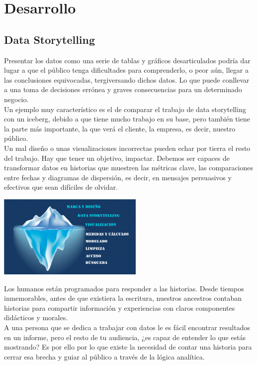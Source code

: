 \documentclass[twoside,twocolumn]{article}
\begin{document}

\section{Desarrollo}

\subsection{Data Storytelling}
Presentar los datos como una serie de tablas y gráficos desarticulados podría dar lugar a que el público tenga dificultades para comprenderlo, o peor aún, llegar a las conclusiones equivocadas, tergiversando dichos datos. Lo que puede conllevar a una toma de decisiones errónea y graves consecuencias para un determinado negocio.\\[0.1in]
Un ejemplo muy característico es el de comparar el trabajo de data storytelling con un iceberg, debido a que tiene mucho trabajo en su base, pero también tiene la parte más importante, la que verá el cliente, la empresa, es decir, nuestro público.\\[0.1in]
Un mal diseño o unas visualizaciones incorrectas pueden echar por tierra el resto del trabajo. Hay que tener un objetivo, impactar. Debemos ser capaces de transformar datos en historias que muestren las métricas clave, las comparaciones entre fechas y diagramas de dispersión, es decir, en mensajes persuasivos y efectivos que sean difíciles de olvidar.
\begin{center}
    \includegraphics[width=7cm]{./img/img1.png}
\end{center}
Los humanos están programados para responder a las historias. Desde tiempos inmemorables, antes de que existiera la escritura, nuestros ancestros contaban historias para compartir información y experiencias con claros componentes didácticos y morales.\\[0.1in]
A una persona que se dedica a trabajar con datos le es fácil encontrar resultados en un informe, pero el resto de tu audiencia, ¿es capaz de entender lo que estás mostrando? Es por ello por lo que existe la necesidad de contar una historia para cerrar esa brecha y guiar al público a través de la lógica analítica.
\end{document}
